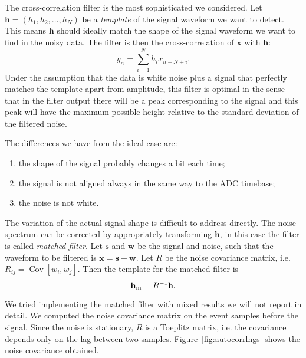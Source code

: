 The cross-correlation filter is the most sophisticated we considered. Let
$\mathbf h = (h_1, h_2, \ldots, h_N)$ be a \emph{template} of the signal
waveform we want to detect. This means $\mathbf h$ should ideally match the
shape of the signal waveform we want to find in the noisy data. The filter is
then the cross-correlation of $\mathbf x$ with $\mathbf h$:
%
\begin{equation}
    y_n = \sum_{i=1}^N h_i x_{n-N+i}.
\end{equation}
%
Under the assumption that the data is white noise plus a signal that perfectly
matches the template apart from amplitude, this filter is optimal in the sense
that in the filter output there will be a peak corresponding to the signal and
this peak will have the maximum possible height relative to the standard
deviation of the filtered noise.

The differences we have from the ideal case are:
%
\begin{enumerate}
    \item the shape of the signal probably changes a bit each time;
    \item the signal is not aligned always in the same way to the ADC timebase;
    \item the noise is not white.
\end{enumerate}

The variation of the actual signal shape is difficult to address directly. The
noise spectrum can be corrected by appropriately transforming $\mathbf h$, in
this case the filter is called \emph{matched filter}. Let $\mathbf s$ and
$\mathbf w$ be the signal and noise, such that the waveform to be filtered is
$\mathbf x = \mathbf s + \mathbf w$. Let $R$ be the noise covariance matrix,
i.e. $R_{ij} = \operatorname{Cov}[w_i, w_j]$. Then the template for the matched
filter is
%
\begin{equation}
    \mathbf h_\text m = R^{-1} \mathbf h.
    \label{eq:matched}    
\end{equation}

We tried implementing the matched filter with mixed results we will not report
in detail. We computed the noise covariance matrix on the event samples before
the signal. Since the noise is stationary, $R$ is a Toeplitz matrix, i.e. the
covariance depends only on the lag between two samples.
Figure~\ref{fig:autocorrlngs} shows the noise covariance obtained.


